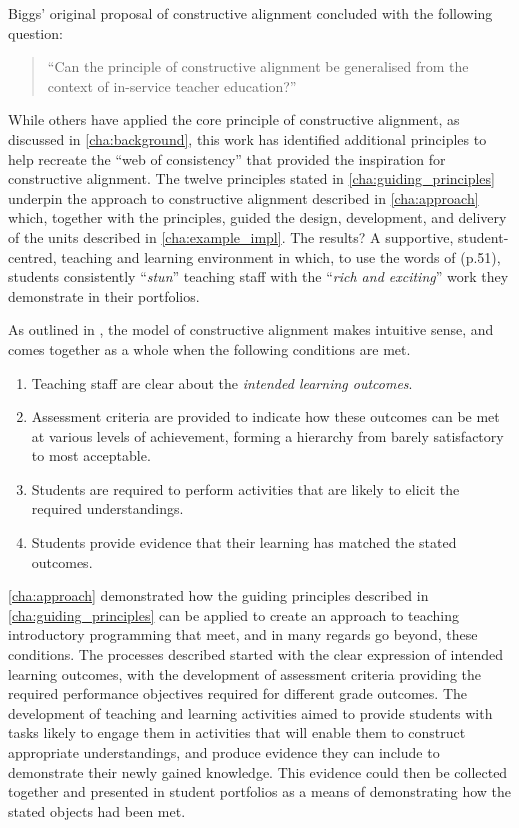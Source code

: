 Biggs' original proposal of constructive alignment concluded with the following question:

\begin{quote}
	``Can the principle of constructive alignment be generalised from the context of in-service teacher education?'' \citet{Biggs:1996c}
\end{quote}

While others have applied the core principle of constructive alignment, as discussed in \cref{cha:background}, this work has identified additional principles to help recreate the ``web of consistency'' that provided the inspiration for \citet{Biggs:1996c,Biggs:1999} constructive alignment. The twelve principles stated in \cref{cha:guiding_principles} underpin the approach to constructive alignment described in \cref{cha:approach} which, together with the principles, guided the design, development, and delivery of the units described in \cref{cha:example_impl}. The results? A supportive, student-centred, teaching and learning environment in which, to use the words of \citet{Biggs:2007} (p.51), students consistently ``\emph{stun}'' teaching staff with the ``\emph{rich and exciting}'' work they demonstrate in their portfolios.

As outlined in \cite{Biggs:1996c}, the model of constructive alignment makes intuitive sense, and comes together as a whole when the following conditions are met.
\begin{enumerate}
	\item Teaching staff are clear about the \emph{intended learning outcomes}.
	\item Assessment criteria are provided to indicate how these outcomes can be met at various levels of achievement, forming a hierarchy from barely satisfactory to most acceptable.
	\item Students are required to perform activities that are likely to elicit the required understandings.
	\item Students provide evidence that their learning has matched the stated outcomes.
\end{enumerate}

\cref{cha:approach} demonstrated how the guiding principles described in \cref{cha:guiding_principles} can be applied to create an approach to teaching introductory programming that meet, and in many regards go beyond, these conditions. The processes described started with the clear expression of intended learning outcomes, with the development of assessment criteria providing the required performance objectives required for different grade outcomes. The development of teaching and learning activities aimed to provide students with tasks likely to engage them in activities that will enable them to construct appropriate understandings, and produce evidence they can include to demonstrate their newly gained knowledge. This evidence could then be collected together and presented in student portfolios as a means of demonstrating how the stated objects had been met.

